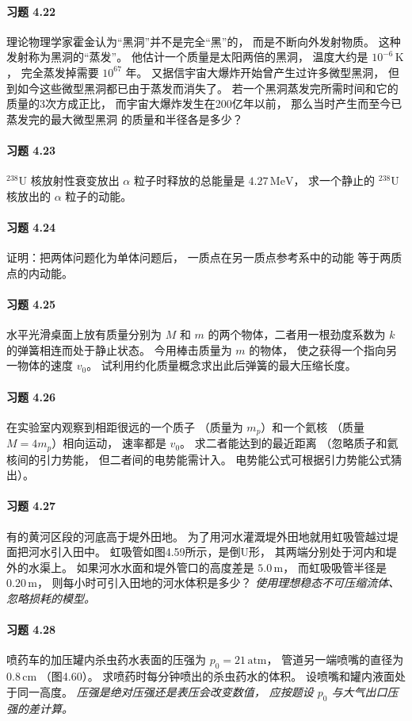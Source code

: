 \paragraph{习题 4.22}
理论物理学家霍金认为“黑洞”并不是完全“黑”的，
而是不断向外发射物质。
这种发射称为黑洞的“蒸发”。
他估计一个质量是太阳两倍的黑洞，
温度大约是 \(10^{-6}\,\mathrm K\)，
完全蒸发掉需要 \(10^{67}\) 年。
又据信宇宙大爆炸开始曾产生过许多微型黑洞，
但到如今这些微型黑洞都已由于蒸发而消失了。
若一个黑洞蒸发完所需时间和它的质量的3次方成正比，
而宇宙大爆炸发生在200亿年以前，
那么当时产生而至今已蒸发完的最大微型黑洞
的质量和半径各是多少？

\paragraph{习题 4.23}
\({}^{238}\mathrm U\) 核放射性衰变放出
\(\alpha\) 粒子时释放的总能量是 \(4.27\,\mathrm{MeV}\)，
求一个静止的 \({}^{238}\mathrm U\) 核放出的
\(\alpha\) 粒子的动能。

\paragraph{习题 4.24}
证明：把两体问题化为单体问题后，
一质点在另一质点参考系中的动能
等于两质点的内动能。

\paragraph{习题 4.25}
水平光滑桌面上放有质量分别为 \(M\) 和 \(m\)
的两个物体，二者用一根劲度系数为 \(k\)
的弹簧相连而处于静止状态。
今用棒击质量为 \(m\) 的物体，
使之获得一个指向另一物体的速度 \(v_0\)。
试利用约化质量概念求出此后弹簧的最大压缩长度。

\paragraph{习题 4.26}
在实验室内观察到相距很远的一个质子
（质量为 \(m_p\)）和一个氦核
（质量 \(M=4m_p\)）相向运动，
速率都是 \(v_0\)。
求二者能达到的最近距离
（忽略质子和氦核间的引力势能，
但二者间的电势能需计入。
电势能公式可根据引力势能公式猜出）。

\paragraph{习题 4.27}
有的黄河区段的河底高于堤外田地。
为了用河水灌溉堤外田地就用虹吸管越过堤面把河水引入田中。
虹吸管如图4.59所示，是倒U形，
其两端分别处于河内和堤外的水渠上。
如果河水水面和堤外管口的高度差是
\(5.0\,\mathrm m\)，
而虹吸吸管半径是 \(0.20\,\mathrm m\)，
则每小时可引入田地的河水体积是多少？
\textit{使用理想稳态不可压缩流体、忽略损耗的模型。}

\paragraph{习题 4.28}
喷药车的加压罐内杀虫药水表面的压强为
\(p_0=21\,\mathrm{atm}\)，
管道另一端喷嘴的直径为 \(0.8\,\mathrm{cm}\)
（图4.60）。
求喷药时每分钟喷出的杀虫药水的体积。
设喷嘴和罐内液面处于同一高度。
\textit{压强是绝对压强还是表压会改变数值，
应按题设 \(p_0\) 与大气出口压强的差计算。}

